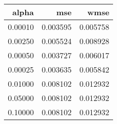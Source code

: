 \begin{tabular}{rrr}
\toprule
  alpha &      mse &     wmse \\
\midrule
0.00010 & 0.003595 & 0.005758 \\
0.00250 & 0.005524 & 0.008928 \\
0.00050 & 0.003727 & 0.006017 \\
0.00025 & 0.003635 & 0.005842 \\
0.01000 & 0.008102 & 0.012932 \\
0.05000 & 0.008102 & 0.012932 \\
0.10000 & 0.008102 & 0.012932 \\
\bottomrule
\end{tabular}
